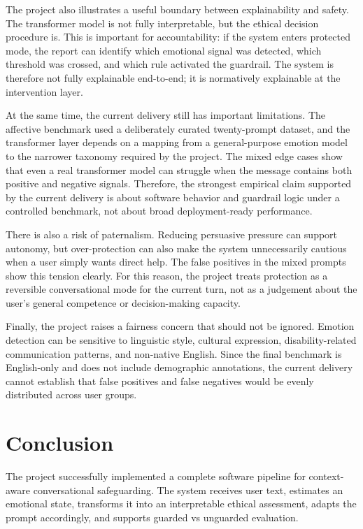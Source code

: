\documentclass[11pt,a4paper]{article}
\begin{document}
The project also illustrates a useful boundary between explainability and safety. The
transformer model is not fully interpretable, but the ethical decision procedure is. This is
important for accountability: if the system enters protected mode, the report can identify
which emotional signal was detected, which threshold was crossed, and which rule activated
the guardrail. The system is therefore not fully explainable end-to-end; it is normatively
explainable at the intervention layer.

At the same time, the current delivery still has important limitations. The affective
benchmark used a deliberately curated twenty-prompt dataset, and the transformer layer
depends on a mapping from a general-purpose emotion model to the narrower taxonomy required
by the project. The mixed edge cases show that even a real transformer model can struggle
when the message contains both positive and negative signals. Therefore, the strongest
empirical claim supported by the current delivery is about software behavior and
guardrail logic under a controlled benchmark, not about broad deployment-ready performance.

There is also a risk of paternalism. Reducing persuasive pressure can support autonomy, but
over-protection can also make the system unnecessarily cautious when a user simply wants
direct help. The false positives in the mixed prompts show this tension clearly. For this
reason, the project treats protection as a reversible conversational mode for the current
turn, not as a judgement about the user's general competence or decision-making capacity.

Finally, the project raises a fairness concern that should not be ignored. Emotion detection
can be sensitive to linguistic style, cultural expression, disability-related communication
patterns, and non-native English. Since the final benchmark is English-only and does not
include demographic annotations, the current delivery cannot establish that false positives
and false negatives would be evenly distributed across user groups.

\section{Conclusion}

The project successfully implemented a complete software pipeline for context-aware
conversational safeguarding. The system receives user text, estimates an emotional state,
transforms it into an interpretable ethical assessment, adapts the prompt accordingly, and
supports guarded vs unguarded evaluation.
\end{document}
